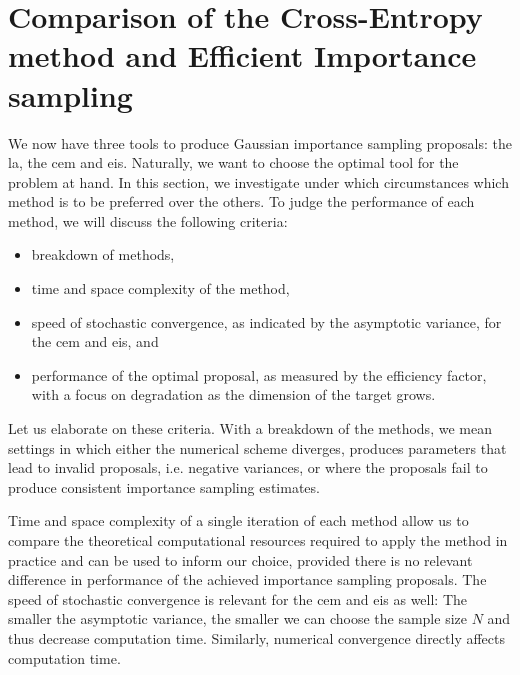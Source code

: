 \section[Comparison of the CE-method and EIS]{Comparison of the Cross-Entropy method and Efficient Importance sampling}
\label{sec:simulation_studies}

We now have three tools to produce Gaussian importance sampling proposals: the \gls{la}, the \gls{cem} and \gls{eis}. Naturally, we want to choose the optimal tool for the problem at hand. In this section, we investigate under which circumstances which method is to be preferred over the others. To judge the performance of each method, we will discuss the following criteria:
\begin{itemize}
    \item breakdown of methods,
    \item time and space complexity of the method,
    \item speed of stochastic convergence, as indicated by the asymptotic variance, for the \gls{cem} and \gls{eis}, and
    \item performance of the optimal proposal, as measured by the efficiency factor, with a focus on degradation as the dimension of the target grows.
\end{itemize}

Let us elaborate on these criteria. With a breakdown of the methods, we mean settings in which either the numerical scheme diverges, produces parameters that lead to invalid proposals, i.e. negative variances, or where the proposals fail to produce consistent importance sampling estimates. 

Time and space complexity of a single iteration of each method allow us to compare the theoretical computational resources required to apply the method in practice and can be used to inform our choice, provided there is no relevant difference in performance of the achieved importance sampling proposals.
The speed of stochastic convergence is relevant for the \acrshort{cem} and \acrshort{eis} as well: The smaller the asymptotic variance, the smaller we can choose the sample size $N$ and thus decrease computation time. 
Similarly, numerical convergence directly affects computation time. 

